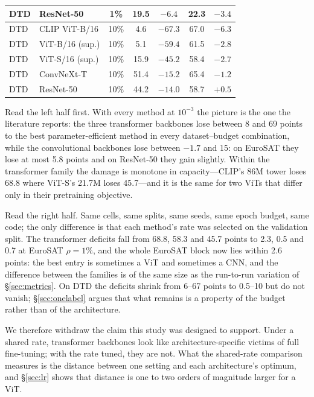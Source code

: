 \documentclass[preprint,12pt]{elsarticle}
\begin{document}
\begin{table}[t]
\begin{tabular}{llcc ccc}
DTD & ResNet-50 & 1\% & 19.5 & $-6.4$ & 22.3 & $-3.4$ \\
\midrule
DTD & CLIP ViT-B/16 & 10\% & 4.6 & $\mathbf{-67.3}$ & 67.0 & $-6.3$ \\
DTD & ViT-B/16 (sup.) & 10\% & 5.1 & $\mathbf{-59.4}$ & 61.5 & $-2.8$ \\
DTD & ViT-S/16 (sup.) & 10\% & 15.9 & $\mathbf{-45.2}$ & 58.4 & $-2.7$ \\
DTD & ConvNeXt-T & 10\% & 51.4 & $\mathbf{-15.2}$ & 65.4 & $-1.2$ \\
DTD & ResNet-50 & 10\% & 44.2 & $\mathbf{-14.0}$ & 58.7 & $+0.5$ \\
\bottomrule
\end{tabular}
\end{table}

Read the left half first. With every method at $10^{-3}$ the picture is the one
the literature reports: the three transformer backbones lose between 8 and 69
points to the best parameter-efficient method in every dataset--budget
combination, while the convolutional backbones lose between $-1.7$ and 15: on EuroSAT they
lose at most 5.8 points and on ResNet-50 they gain slightly. Within the transformer family the damage is monotone in
capacity---CLIP's 86M tower loses 68.8 where ViT-S's 21.7M loses 45.7---and it is
the same for two ViTs that differ only in their pretraining objective.

Read the right half. Same cells, same splits, same seeds, same epoch budget, same
code; the only difference is that each method's rate was selected on the
validation split. The transformer deficits fall from 68.8, 58.3 and 45.7 points to
2.3, 0.5 and 0.7 at EuroSAT $\rho=1\%$, and the whole EuroSAT block now lies
within 2.6 points: the best entry is sometimes a ViT and sometimes a CNN, and the
difference between the families is of the same size as the run-to-run variation
of \S\ref{sec:metrics}. On DTD the deficits shrink from 6--67 points to 0.5--10 but
do not vanish; \S\ref{sec:onelabel} argues that what remains is a property of
the budget rather than of the architecture.

We therefore withdraw the claim this study was designed to support. Under a shared
rate, transformer backbones look like architecture-specific victims of full
fine-tuning; with the rate tuned, they are not. What the shared-rate comparison
measures is the distance between one setting and each architecture's optimum, and
\S\ref{sec:lr} shows that distance is one to two orders of magnitude larger for
a ViT.
\end{document}
